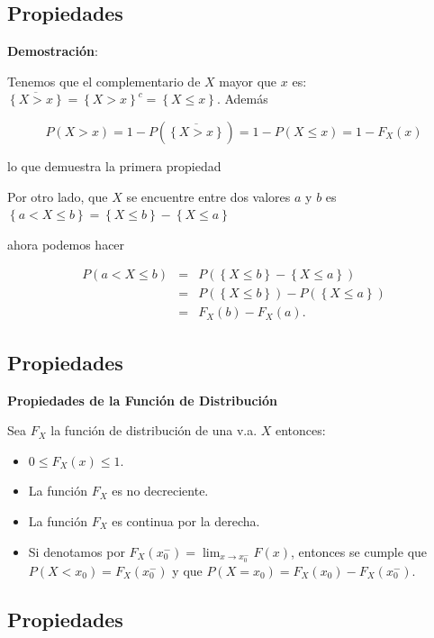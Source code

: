 \documentclass[]{book}
\providecommand{\tightlist}{%
  \setlength{\itemsep}{0pt}\setlength{\parskip}{0pt}}
\begin{document}
\hypertarget{propiedades-13}{%
\subsection{Propiedades}\label{propiedades-13}}

\textbf{Demostración}:

Tenemos que el complementario de \(X\) mayor que \(x\) es: \(\overline{\left\{X>x\right\}}=\left\{X>x\right\}^c=\left\{X\leq x\right\}\). Además

\[P(X>x)=1-P(\overline{\left\{X>x\right\}})=1-P(X\leq x)=1-F_{X}(x)\]

lo que demuestra la primera propiedad

Por otro lado, que \(X\) se encuentre entre dos valores \(a\) y \(b\) es \(\left\{a< X \leq b\right\}= \left\{X\leq b\right\}-\left\{X\leq a\right\}\)

ahora podemos hacer

\begin{eqnarray*}
P(a<X\leq b)&=&P(\left\{X\leq b\right\}-\left\{X\leq a\right\})\\
&=& P(\left\{X\leq b\right\})-P(\left\{X\leq a\right\})\\
&=& F_{X}(b)-F_{X}(a).
\end{eqnarray*}

\hypertarget{propiedades-14}{%
\subsection{Propiedades}\label{propiedades-14}}

 \textbf{Propiedades de la Función de Distribución}

Sea \(F_{X}\) la función de distribución de una v.a. \(X\) entonces:

\begin{itemize}
\tightlist
\item
  \(0\leq F_{X}(x)\leq 1\).
\item
  La función \(F_{X}\) es no decreciente.
\item
  La función \(F_{X}\) es continua por la derecha.
\item
  Si denotamos por \(F_X(x_0^{-})=\displaystyle \lim_{x\to x_0^{-}} F(x)\),
  entonces se cumple que \(P(X< x_0)=F_X(x_0^{-})\) y que \(P(X=x_0)=F_X(x_0)-F_X(x_0^{-})\).
\end{itemize}

\hypertarget{propiedades-15}{%
\subsection{Propiedades}\label{propiedades-15}}
\end{document}
